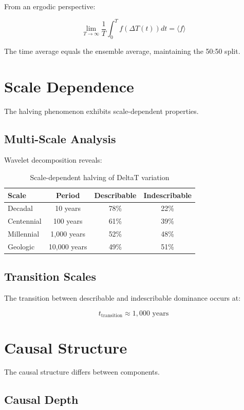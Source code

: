 \documentclass[12pt,a4paper]{report}
\begin{document}
From an ergodic perspective:

\[
\lim_{T \to \infty} \frac{1}{T} \int_0^T f(\Delta T(t)) dt = \langle f \rangle
\]

The time average equals the ensemble average, maintaining the 50:50 split.

\section{Scale Dependence}

The halving phenomenon exhibits scale-dependent properties.

\subsection{Multi-Scale Analysis}

Wavelet decomposition reveals:

\begin{table}[h]
\centering
\begin{tabular}{|l|c|c|c|}
\hline
\textbf{Scale} & \textbf{Period} & \textbf{Describable} & \textbf{Indescribable} \\
\hline
Decadal & 10 years & 78\% & 22\% \\
Centennial & 100 years & 61\% & 39\% \\
Millennial & 1,000 years & 52\% & 48\% \\
Geologic & 10,000 years & 49\% & 51\% \\
\hline
\end{tabular}
\caption{Scale-dependent halving of DeltaT variation}
\end{table}

\subsection{Transition Scales}

The transition between describable and indescribable dominance occurs at:

\[
t_{\text{transition}} \approx 1,000 \text{ years}
\]

\section{Causal Structure}

The causal structure differs between components.

\subsection{Causal Depth}
\end{document}
